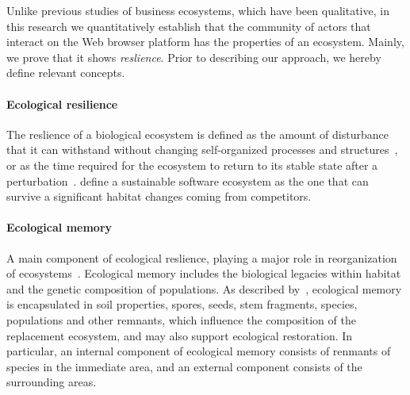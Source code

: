 \documentclass[ijoc,nonblindrev]{informs3} %
\numberwithin{equation}{subsection}
\begin{document}
Unlike previous studies of business ecosystems, which have been qualitative, in this research we quantitatively establish that the community of actors that interact on the Web browser platform has the properties of an ecosystem. Mainly, we prove that it shows {\it reslience}. Prior to describing our approach, we hereby define relevant concepts.

\paragraph{Ecological resilience}
\label{sec:eco_resilience}

The reslience of a biological ecosystem is defined as the amount of disturbance that it can withstand without changing self-organized processes and structures~\citep{holling1973resilience}, or as the time required for the ecosystem to return to its stable state after a perturbation~\citep{tilman1996biodiversity}. \cite{dhungana2010software} define a sustainable software ecosystem as the one that can survive a significant habitat changes coming from competitors.

\paragraph{Ecological memory} 

A main component of ecological reslience, playing a major role in reorganization of ecosystems~\citep{gunderson2000ecological}. Ecological memory includes the biological legacies within habitat and the genetic composition of populations. As described by~\cite{schaefer2009alien}, ecological memory is encapsulated in soil properties, spores, seeds, stem fragments, species, populations and other remnants, which influence the composition of the replacement ecosystem, and may also support ecological restoration. In particular, an internal component of ecological memory consists of renmants of species in the immediate area, and an external component consists of the surrounding areas. 

\end{document}
